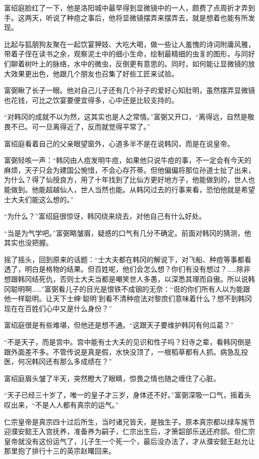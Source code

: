 富绍庭脸红了一下，他是洛阳城中最早得到显微镜中的一人，颇费了点周折才弄到手。这两天，听说了种痘之事后，他将显微镜摆弄来摆弄去，就是想着也能有所发现。

比起与狐朋狗友聚在一起饮宴狎妓、大吃大喝，做一些让人羞愧的诗词附庸风雅，带着子侄在读书之余，观察泥土中的细小生命，绘制最精细的虫豸的图形，与同好们聊着树叶上的脉络，水中的微虫，反倒更有意思的。同时，如何能让显微镜的放大效果更出色，他跟几个朋友也召集了好些工匠来试验。

富弼瞅了长子一眼。他对自己儿子还有几个孙子的爱好心知肚明，虽然摆弄显微镜也花钱，可比之饮宴要便宜得多，心中还是比较支持的。

“对韩冈的成就不以为然，这其实也是人之常情。”富弼又开口，“离得远，自然是敬畏不已。可一旦离得近了，反而就觉得平常了。”

富绍庭看着自己的父亲眼望窗外，心道多半不是在说韩冈，而是在说皇帝。

富弼轻咳一声：“韩冈由人痘发明牛痘，如果他只说牛痘的事，不一定会有今天的麻烦，天子只会为建国公惋惜，不会心存芥蒂。但他偏偏将那位孙道士扯了出来，为什么？得了仙授良方，用了十年找到了比仙方更好地方子，他能做到的，世人也能做到。他能超越仙人，世人当然也能。从韩冈过去的行事来看，恐怕他就是希望士大夫们能这么想的。”

“为什么？”富绍庭很惊讶，韩冈绕来绕去，对他自己有什么好处。

“当是为气学吧。”富弼略皱眉，疑惑的口气有几分不确定。前面对韩冈的猜测，他其实也没把握。

摇了摇头，回到原来的话题：“士大夫都在韩冈的解说下，对飞船、种痘等事都看透了，明白是格物的结果。但百姓呢，他们会怎么想？你们有没有想过？……除非想跟韩冈结死仇，否则士大夫当都是嘲笑世人多愚，以深悉其理而自傲。所以说韩冈聪明啊……”富弼看儿子的目光是恨铁不成钢的无奈：“诳的你们所有人以为能跟他一样聪明。让天下士绅‘聪明’到看不清种痘法对黎庶们意味着什么？想不到韩冈现在在百姓们心中又是什么身份？”

富绍庭很是有些难堪，但他还是想不通。“这跟天子要维护韩冈有何瓜葛？”

“不是天子，而是宫中。宫中能有士大夫的见识和性子吗？妇寺之辈，看韩冈倒是跟外面差不多。不管传说是真是假，水快没顶了，一根稻草都有人抓。病急乱投医，何况韩冈还有那么多成绩在？”

富绍庭眉头皱了半天，突然瞪大了眼睛，惊畏之情也随之缠住了心脏。

“天子已经三十岁了，唯一的皇子才三岁，身体还不好。”富弼深吸一口气，摇着头叹出来，“不是人人都有真宗的运气。”

仁宗皇帝是真宗四十过后所生，当时诸兄皆夭，是独生子。原本真宗都以绿车旄节迎濮安懿王入宫抚养，准备养为嗣子，仁宗出生后，才箫韶部乐送还府邸。但仁宗皇帝就没有这份运气了，儿子生一个死一个，最后没办法了，才从濮安懿王赵允让那里抱了排行十三的英宗赵曙回来。

